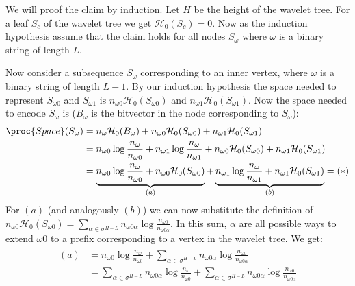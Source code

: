 \begin{Proof}
  We will proof the claim by induction. Let $H$ be the height of the wavelet tree. For a leaf $S_c$ of the wavelet tree we get $\mathcal{H}_0(S_c) = 0$. Now as the induction hypothesis assume that the claim holds for all nodes $S_\omega$ where $\omega$ is a binary string of length $L$.

  Now consider a subsequence $S_\omega$ corresponding to an inner vertex, where $\omega$ is a binary string of length $L - 1$. By our induction hypothesis the space needed to represent $S_{\omega 0}$ and $S_{\omega 1}$ is $n_{\omega 0}\mathcal{H}_0(S_{\omega 0})$ and $n_{\omega 1}\mathcal{H}_0(S_{\omega 1})$. Now the space needed to encode $S_\omega$ is ($B_\omega$ is the bitvector in the node corresponding to $S_\omega$):
  \begin{align}
    \begin{aligned}
      \proc{Space}(S_\omega)
      &= n_\omega\mathcal{H}_0(B_\omega) + n_{\omega 0}\mathcal{H}_0(S_{\omega 0}) + n_{\omega 1}\mathcal{H}_0(S_{\omega 1}) \\
      &= n_{\omega 0}\log\frac{n_\omega}{n_{\omega 0}} + n_{\omega 1}\log\frac{n_\omega}{n_{\omega 1}} + n_{\omega 0}\mathcal{H}_0(S_{\omega 0}) + n_{\omega 1}\mathcal{H}_0(S_{\omega 1}) \\
      &= \underbrace{n_{\omega 0}\log\frac{n_\omega}{n_{\omega 0}} + n_{\omega 0}\mathcal{H}_0(S_{\omega 0})}_{(a)} + \underbrace{n_{\omega 1}\log\frac{n_\omega}{n_{\omega 1}} + n_{\omega 1}\mathcal{H}_0(S_{\omega 1})}_{(b)} = (*)
    \end{aligned}
  \end{align}
  For $(a)$ (and analogously $(b)$) we can now substitute the definition of $n_{\omega 0}\mathcal{H}_0(S_{\omega 0}) = \sum_{\alpha \in \sigma^{H - L}} n_{\omega 0\alpha} \log\frac{n_{\omega 0}}{n_{\omega 0\alpha}}$. In this sum, $\alpha$ are all possible ways to extend $\omega 0$ to a prefix corresponding to a vertex in the wavelet tree. We get:
  \begin{align}
    \begin{aligned}
      (a)
      &= n_{\omega 0}\log\frac{n_\omega}{n_{\omega 0}} + \sum\limits_{\alpha \in \sigma^{H - L}} n_{\omega 0\alpha} \log\frac{n_{\omega 0}}{n_{\omega 0\alpha}} \\
      &= \sum\limits_{\alpha \in \sigma^{H - L}} n_{\omega 0\alpha} \log\frac{n_\omega}{n_{\omega 0}} + \sum\limits_{\alpha \in \sigma^{H - L}} n_{\omega 0\alpha} \log\frac{n_{\omega 0}}{n_{\omega 0\alpha}} \\

\end{aligned}
\end{align}
\end{Proof}
